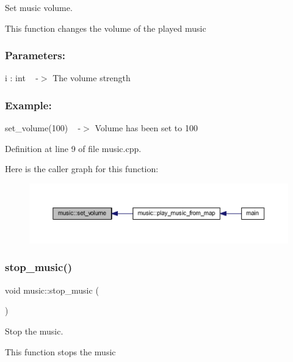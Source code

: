 Set music volume. 

This function changes the volume of the played music ~\newline
 \subsubsection*{Parameters\+: }

i \+: int ~\newline
-\/$>$ The volume strength ~\newline
 \subsubsection*{Example\+: }

set\+\_\+volume(100) ~\newline
-\/$>$ Volume has been set to 100 ~\newline


Definition at line 9 of file music.\+cpp.

Here is the caller graph for this function\+:
\nopagebreak
\begin{figure}[H]
\begin{center}
\leavevmode
\includegraphics[width=350pt]{classmusic_aeb639e45c64ee79496e8ec6187cfcf70_icgraph}
\end{center}
\end{figure}
\mbox{\label{classmusic_ae89df284db606b4fb68f9e99702a6872}} 
\subsubsection{\texorpdfstring{stop\+\_\+music()}{stop\_music()}}
{\footnotesize\ttfamily void music\+::stop\+\_\+music (\begin{DoxyParamCaption}{ }\end{DoxyParamCaption})}



Stop the music. 

This function stops the music ~\newline
